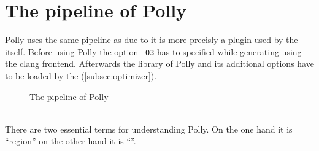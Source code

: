\section{The pipeline of Polly}
Polly uses the same pipeline as \llvm due to it is more precisly a plugin used by the \opt itself. Before using Polly the option \texttt{-O3} has to specified while generating \llvmir using the clang frontend.
Afterwards the library of Polly and its additional options have to be loaded by the \opt (\autoref{subsec:optimizer}).
\begin{figure}[h]
    \caption[The pipeline of Polly]{The pipeline of Polly \cite{PollyPresentation}}
    \centering
\end{figure}\\
There are two essential terms for understanding Polly. On the one hand it is \enquote{region} on the other hand it is \enquote{\scop}.
